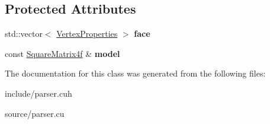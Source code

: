 \subsection*{Protected Attributes}
\begin{DoxyCompactItemize}
\item 
std\+::vector$<$ \hyperlink{struct_vertex_properties}{Vertex\+Properties} $>$ {\bfseries face}\hypertarget{class_c_g_parser_a5b4cc58941319a67b2b8af64bf71700c}{}\label{class_c_g_parser_a5b4cc58941319a67b2b8af64bf71700c}

\item 
const \hyperlink{class_square_matrix4}{Square\+Matrix4f} \& {\bfseries model}\hypertarget{class_c_g_parser_a4e7b8ca9b61edd11d3380f0f9e535f4c}{}\label{class_c_g_parser_a4e7b8ca9b61edd11d3380f0f9e535f4c}

\end{DoxyCompactItemize}


The documentation for this class was generated from the following files\+:\begin{DoxyCompactItemize}
\item 
include/parser.\+cuh\item 
source/parser.\+cu\end{DoxyCompactItemize}

